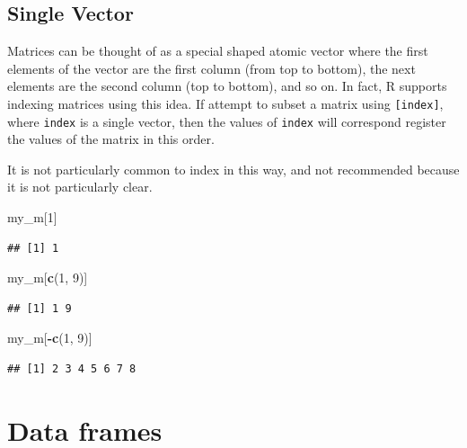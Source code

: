 \documentclass[
]{book}
\newenvironment{Shaded}{\begin{snugshade}}{\end{snugshade}}
\newcommand{\DecValTok}[1]{\textcolor[rgb]{0.00,0.00,0.81}{#1}}
\newcommand{\KeywordTok}[1]{\textcolor[rgb]{0.13,0.29,0.53}{\textbf{#1}}}
\newcommand{\NormalTok}[1]{#1}
\newcommand{\OperatorTok}[1]{\textcolor[rgb]{0.81,0.36,0.00}{\textbf{#1}}}
\begin{document}
\hypertarget{single-vector}{%
\subsection{Single Vector}\label{single-vector}}

Matrices can be thought of as a special shaped atomic vector where the first elements of the vector are the first column (from top to bottom), the next elements are the second column (top to bottom), and so on. In fact, R supports indexing matrices using this idea. If attempt to subset a matrix using \texttt{{[}index{]}}, where \texttt{index} is a single vector, then the values of \texttt{index} will correspond register the values of the matrix in this order.

It is not particularly common to index in this way, and not recommended because it is not particularly clear.

\begin{Shaded}
\begin{Highlighting}[]
\NormalTok{my_m[}\DecValTok{1}\NormalTok{]}
\end{Highlighting}
\end{Shaded}

\begin{verbatim}
## [1] 1
\end{verbatim}

\begin{Shaded}
\begin{Highlighting}[]
\NormalTok{my_m[}\KeywordTok{c}\NormalTok{(}\DecValTok{1}\NormalTok{, }\DecValTok{9}\NormalTok{)]}
\end{Highlighting}
\end{Shaded}

\begin{verbatim}
## [1] 1 9
\end{verbatim}

\begin{Shaded}
\begin{Highlighting}[]
\NormalTok{my_m[}\OperatorTok{-}\KeywordTok{c}\NormalTok{(}\DecValTok{1}\NormalTok{, }\DecValTok{9}\NormalTok{)]}
\end{Highlighting}
\end{Shaded}

\begin{verbatim}
## [1] 2 3 4 5 6 7 8
\end{verbatim}

\hypertarget{data-frames-1}{%
\section{Data frames}\label{data-frames-1}}
\end{document}
